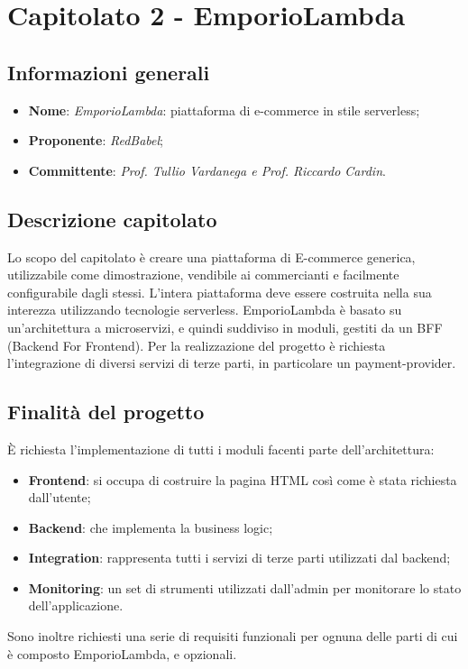 \section{Capitolato 2 - EmporioLambda}
\subsection{Informazioni generali}
\begin{itemize}
    \item \textbf{Nome}: \emph{EmporioLambda}: piattaforma di e-commerce in stile serverless;
    \item \textbf{Proponente}: \emph{RedBabel};
    \item \textbf{Committente}: \emph{Prof. Tullio Vardanega e Prof. Riccardo Cardin}.
\end{itemize}
\subsection{Descrizione capitolato}
Lo scopo del capitolato è creare una piattaforma di E-commerce generica, utilizzabile come dimostrazione, vendibile ai commercianti e facilmente configurabile dagli stessi. L'intera piattaforma deve essere costruita nella sua interezza utilizzando tecnologie serverless. EmporioLambda è basato su un'architettura a microservizi, e quindi suddiviso in moduli, gestiti da un BFF (Backend For Frontend). Per la realizzazione del progetto è richiesta l'integrazione di diversi servizi di terze parti, in particolare un payment-provider.
\subsection{Finalità del progetto}
È richiesta l'implementazione di tutti i moduli facenti parte dell'architettura:
\begin{itemize}
	\item \textbf{Frontend}: si occupa di costruire la pagina HTML così come è stata richiesta dall'utente;
	\item \textbf{Backend}: che implementa la business logic;
	\item \textbf{Integration}: rappresenta tutti i servizi di terze parti utilizzati dal backend;
	\item \textbf{Monitoring}: un set di strumenti utilizzati dall'admin per monitorare lo stato dell'applicazione.
\end{itemize}
Sono inoltre richiesti una serie di requisiti funzionali per ognuna delle parti di cui è composto EmporioLambda, e opzionali.

